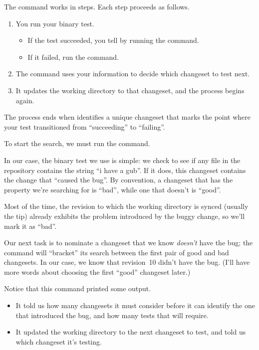 The  command works in steps.  Each step proceeds as follows.
\begin{enumerate}
\item You run your binary test.
  \begin{itemize}
  \item If the test succeeded, you tell  by running the
     command.
  \item If it failed, run the  command.
  \end{itemize}
\item The command uses your information to decide which changeset to
  test next.
\item It updates the working directory to that changeset, and the
  process begins again.
\end{enumerate}
The process ends when  identifies a unique changeset
that marks the point where your test transitioned from ``succeeding''
to ``failing''.

To start the search, we must run the  command.

In our case, the binary test we use is simple: we check to see if any
file in the repository contains the string ``i have a gub''.  If it
does, this changeset contains the change that ``caused the bug''.  By
convention, a changeset that has the property we're searching for is
``bad'', while one that doesn't is ``good''.

Most of the time, the revision to which the working directory is
synced (usually the tip) already exhibits the problem introduced by
the buggy change, so we'll mark it as ``bad''.

Our next task is to nominate a changeset that we know \emph{doesn't}
have the bug; the  command will ``bracket'' its search
between the first pair of good and bad changesets.  In our case, we
know that revision~10 didn't have the bug.  (I'll have more words
about choosing the first ``good'' changeset later.)

Notice that this command printed some output.
\begin{itemize}
\item It told us how many changesets it must consider before it can
  identify the one that introduced the bug, and how many tests that
  will require.
\item It updated the working directory to the next changeset to test,
  and told us which changeset it's testing.
\end{itemize}

